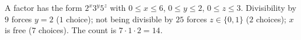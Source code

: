 A factor has the form $2^x3^y5^z$ with $0\le x\le6$, $0\le y\le2$, $0\le z\le3$. Divisibility by $9$ forces $y=2$ ($1$ choice); not being divisible by $25$ forces $z\in\{0,1\}$ ($2$ choices); $x$ is free ($7$ choices). The count is $7\cdot1\cdot2=\boxed{14}$.
